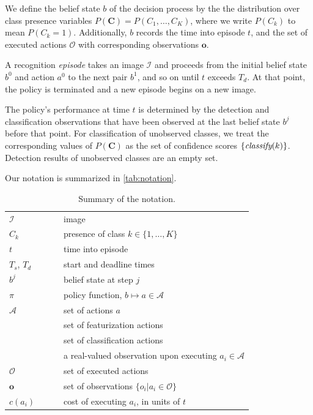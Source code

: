 We define the belief state $b$ of the decision process by the the distribution over class presence variables $P(\mathbf{C}) = P(C_1, \dots, C_K)$, where we write $P(C_k)$ to mean $P(C_k=1)$.
Additionally, $b$ records the time into episode $t$, and the set of executed actions $\mathcal{O}$ with corresponding observations $\mathbf{o}$.

A recognition \emph{episode} takes an image $\mathcal{I}$ and proceeds from the initial belief state $b^0$ and action $a^0$ to the next pair $b^1$, and so on until $t$ exceeds $T_d$.
At that point, the policy is terminated and a new episode begins on a new image.

The policy's performance at time $t$ is determined by the detection and classification observations that have been observed at the last belief state $b^j$ before that point.
For classification of unobserved classes, we treat the corresponding values of $P(\mathbf{C})$ as the set of confidence scores $\{\emph{classify}(k)\}$.
Detection results of unobserved classes are an empty set.

Our notation is summarized in \autoref{tab:notation}.

\begin{table}[h!]
\centering
\caption{Summary of the notation.}
\label{tab:notation}
\begin{tabular}{|l|l|}
  \hline
  $\mathcal{I}$ & image \\
  $C_k$         & presence of class $k \in \{1,\dots,K\}$ \\ 
  $t$           & time into episode \\ 
  $T_s$, $T_d$  & start and deadline times \\ 
  $b^j$         & belief state at step $j$ \\ 
  $\pi$         & policy function, $b \mapsto a \in \mathcal{A}$ \\
  $\mathcal{A}$ & set of actions $a$\\ 
  \comment{$\mathcal{F}$ & set of featurization actions \\}
  \comment{$\mathcal{L}$ & set of classification actions\\}
  $o_i$         & a real-valued observation upon executing $a_i \in \mathcal{A}$\\
  $\mathcal{O}$ & set of executed actions\\
  $\mathbf{o}$  & set of observations $\{o_i | a_i \in \mathcal{O}\}$\\
  $c(a_i)$        & cost of executing $a_i$, in units of $t$\\
  \hline
\end{tabular}\end{table}

